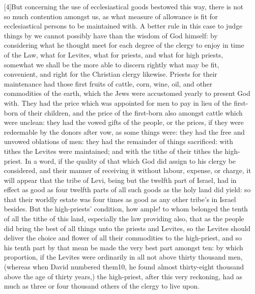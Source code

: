 [4]But concerning the use of ecclesiastical goods bestowed  this way, there is not so much contention amongst us, as what measure of allowance is fit for ecclesiastical persons to be maintained with. A better rule in this case to judge things by we cannot possibly have than the wisdom of God himself: by considering what he thought meet for each degree of the clergy to enjoy in time of the Law, what for Levites, what for priests, and what for high priests, somewhat we shall be the more able to discern rightly what may be fit, convenient, and right for the Christian clergy likewise. Priests for their maintenance had those first fruits of cattle, corn, wine, oil, and other commodities of the earth, which the Jews were accustomed yearly to present God with. They had the price which was appointed for men to pay in lieu of the first-born of their children, and the price of the first-born also amongst cattle which were unclean: they had the vowed gifts of the people, or the prices, if they were redeemable by the donors after vow, as some things were: they had the free and unvowed oblations of men: they had the remainder of things sacrificed: with tithes the Levites were maintained; and with the tithe of their tithes the high-priest. In a word, if the quality of that which God did assign to his clergy be considered, and their manner of receiving it without labour, expense, or charge, it will appear that the tribe of Levi, being but the twelfth part of Israel, had in effect as good as four twelfth parts of all such goods as the holy land did yield: so that their worldly estate was four times as good as any other tribe’s in Israel besides. But the high-priests’ condition, how ample! to whom belonged the tenth of all the tithe of this land, especially the law providing also, that as the people did bring the best of all things unto the priests and Levites, so the Levites should deliver the choice and flower of all their commodities to the high-priest, and so his tenth part by that mean be made the very best part amongst ten: by which proportion, if the Levites were ordinarily in all not above thirty thousand men, (whereas when David numbered them10, he found almost thirty-eight thousand above the age of thirty years,) the high-priest, after this  very reckoning, had as much as three or four thousand others of the clergy to live upon.

